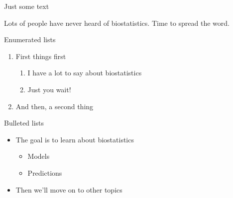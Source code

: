 \documentclass{beamer}
\begin{document}

\begin{frame}{Just some text}

Lots of people have never heard of biostatistics. Time to spread the word.

\end{frame}




\begin{frame}{Enumerated lists}

\begin{enumerate}
	\item First things first
	\begin{enumerate}
		\item I have a lot to say about biostatistics
		\item Just you wait!
	\end{enumerate}
	\item And then, a second thing
\end{enumerate}

\end{frame}




\begin{frame}{Bulleted lists}

\begin{itemize}
	\item The goal is to learn about biostatistics
	\begin{itemize}
		\item Models
		\item Predictions
	\end{itemize}
	\item Then we'll move on to other topics
\end{itemize}

\end{frame}


\end{document}
